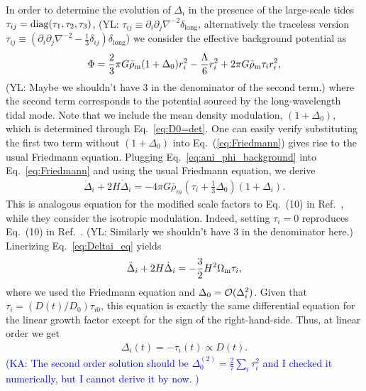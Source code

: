 \documentclass[a4paper,11pt]{article}
\newcommand{\YL}[1]{\textcolor{Bittersweet}{(YL: #1)}}
\newcommand{\KA}[1]{\textcolor{Blue}{(KA: #1)}}
\begin{document}
In order to determine the evolution of $\Delta_i$ in the presence of the large-scale tides $\tau_{ij}={\rm diag}(\tau_1,\tau_2,\tau_3)$,
\YL{$\tau_{ij} \equiv \partial_i \partial_j \nabla^{-2} \delta_\mathrm{long}$, alternatively the traceless version
$\tau_{ij} \equiv (\partial_i \partial_j \nabla^{-2} - \frac13\delta_{ij}) \delta_\mathrm{long}$}
we consider the effective background potential as
\begin{align}
    \Phi = \frac{2}{3}\pi G\bar{\rho}_{\rm m}(1+\Delta_0) r_i^2 - \frac{\Lambda}{6}r_i^2
            +2 \pi G\bar{\rho}_{\rm m}\tau_i r_i^2,
            \label{eq:ani_phi_background}
\end{align}
\YL{Maybe we shouldn't have 3 in the denominator of the second term.}
where the second term corresponds to the potential sourced by the long-wavelength tidal mode.
Note that we include the mean density modulation, $(1+\Delta_0)$,
which is determined through Eq.~\eqref{eq:D0=det}.
One can easily verify substituting the first two term without $(1+\Delta_0)$
into Eq.~(\ref{eq:Friedmann}) gives rise to the usual Friedmann equation.
Plugging Eq.~\eqref{eq:ani_phi_background} into Eq.~\eqref{eq:Friedmann}
and using the usual Friedmann equation,
we derive
\begin{align}
    \ddot \Delta_i + 2H\dot \Delta_i
    = -4\pi G \bar{\rho}_m\left(\tau_i + \frac{1}{3}\Delta_0\right) (1+\Delta_i).
    \label{eq:Deltai_eq}
\end{align}
This is analogous equation for the modified scale factors to Eq.~(10) in Ref.~\cite{Wagner_etal:2014},
while they consider the isotropic modulation.
Indeed, setting $\tau_i=0$ reproduces Eq.~(10) in Ref.~\cite{Wagner_etal:2014}.
\YL{Similarly we shouldn't have 3 in the denominator here.}
Linerizing Eq.~\eqref{eq:Deltai_eq} yields
\begin{align}
 \ddot \Delta_i + 2H\dot \Delta_i
 = -\frac{3}{2}H^2\Omega_{\rm m}\tau_i,
\end{align}
where we used the Friedmann equation and $\Delta_0 = {\cal O}(\Delta_i^2)$.
Given that $\tau_i = (D(t)/D_0)\tau_{i0}$,
this equation is exactly the same differential equation for the linear growth factor
except for the sign of the right-hand-side.
Thus, at linear order we get
\begin{align}
\Delta_i(t) = -\tau_i(t) \propto D(t).
\end{align}
\KA{
The second order solution should be $\Delta^{(2)}_0 = \frac{2}{7}\sum_i\tau_i^2$ and I checked it numerically, but I cannot derive it by now.
}
\end{document}
